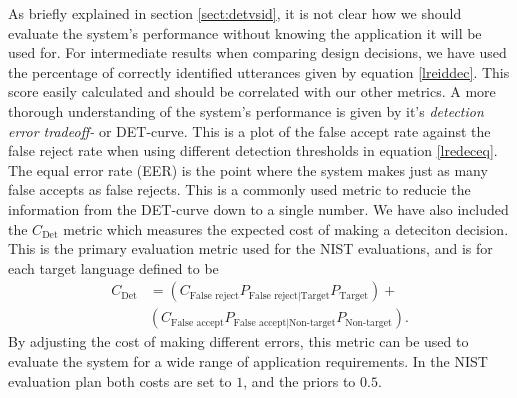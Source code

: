 As briefly explained in section \ref{sect:detvsid}, it is not clear how we should evaluate the system's performance without knowing the application it will be used for. For intermediate results when comparing design decisions, we have used the percentage of correctly identified utterances given by equation \ref{lreiddec}. This score easily calculated and should be correlated with our other metrics. A more thorough understanding of the system's performance is given by it's \emph{detection error tradeoff-} or DET-curve. This is a plot of the false accept rate against the false reject rate when using different detection thresholds in equation \ref{lredeceq}. The equal error rate (EER) is the point where the system makes just as many false accepts as false rejects. This is a commonly used metric to reducie the information from the DET-curve down to a single number. We have also included the $C_{\text{Det}}$ metric which measures the expected cost of making a deteciton decision. This is the primary evaluation metric used for the NIST evaluations, and is for each target language defined to be \cite{martin2003nist}
\begin{align*}
C_{\text{Det}} &=(C_{\text{False reject}}P_{\text{False reject} | \text{Target}}P_{\text{Target}})+\\
&(C_{\text{False accept}}P_{\text{False accept} | \text{Non-target}}P_{\text{Non-target}}).
\end{align*}
By adjusting the cost of making different errors, this metric can be used to evaluate the system for a wide range of application requirements. In the NIST evaluation plan both costs are set to $1$, and the priors to $0.5$. 